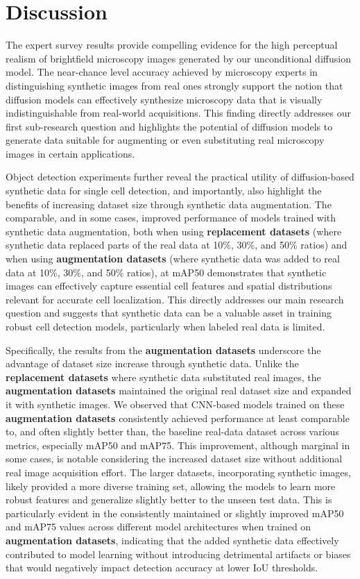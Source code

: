 \section{Discussion}
\label{sec:discussion}
The expert survey results provide compelling evidence for the high perceptual realism of brightfield microscopy images generated by our unconditional diffusion model.
The near-chance level accuracy achieved by microscopy experts in distinguishing synthetic images from real ones strongly support the notion that diffusion models can effectively synthesize microscopy data that is visually indistinguishable from real-world acquisitions.
This finding directly addresses our first sub-research question and highlights the potential of diffusion models to generate data suitable for augmenting or even substituting real microscopy images in certain applications.

Object detection experiments further reveal the practical utility of diffusion-based synthetic data for single cell detection, and importantly, also highlight the benefits of increasing dataset size through synthetic data augmentation.
The comparable, and in some cases, improved performance of models trained with synthetic data augmentation, both when using \textbf{replacement datasets} (where synthetic data replaced parts of the real data at 10\%, 30\%, and 50\% ratios) and when using \textbf{augmentation datasets} (where synthetic data was added to real data at 10\%, 30\%, and 50\% ratios), at mAP\@50 demonstrates that synthetic images can effectively capture essential cell features and spatial distributions relevant for accurate cell localization.
This directly addresses our main research question and suggests that synthetic data can be a valuable asset in training robust cell detection models, particularly when labeled real data is limited.

Specifically, the results from the \textbf{augmentation datasets} underscore the advantage of dataset size increase through synthetic data.
Unlike the \textbf{replacement datasets} where synthetic data substituted real images, the \textbf{augmentation datasets} maintained the original real dataset size and expanded it with synthetic images.
We observed that CNN-based models trained on these \textbf{augmentation datasets} consistently achieved performance at least comparable to, and often slightly better than, the baseline real-data dataset across various metrics, especially mAP\@50 and mAP\@75.
This improvement, although marginal in some cases, is notable considering the increased dataset size without additional real image acquisition effort.
The larger datasets, incorporating synthetic images, likely provided a more diverse training set, allowing the models to learn more robust features and generalize slightly better to the unseen test data.
This is particularly evident in the consistently maintained or slightly improved mAP\@50 and mAP\@75 values across different model architectures when trained on \textbf{augmentation datasets}, indicating that the added synthetic data effectively contributed to model learning without introducing detrimental artifacts or biases that would negatively impact detection accuracy at lower IoU thresholds.

